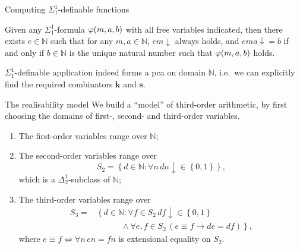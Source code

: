 \documentclass{beamer}
\begin{document}
\begin{frame}{Computing $\Sigma^1_1$-definable functions}
  \begin{lemma}
    Given any $\Sigma^1_1$-formula $\varphi\mleft(m, a, b\mright)$ with all free variables indicated, then there exists $e \in \mathbb{N}$ such that for any $m, a \in \mathbb{N}$, $em {\downarrow}$ always holds, and $ema {\downarrow} = b$ if and only if $b \in \mathbb{N}$ is the unique natural number such that $\varphi\mleft(m, a, b\mright)$ holds.
  \end{lemma}

  \vspace{1em}

  \begin{corollary}
    $\Sigma^1_1$-definable application indeed forms a pca on domain $\mathbb{N}$, i.e.\ we can explicitly find the required combinators $\mathbf{k}$ and $\mathbf{s}$.
  \end{corollary}
\end{frame}

\begin{frame}{The realisability model}
  We build a ``model'' of third-order arithmetic, by first choosing the domains of first-, second- and third-order variables.

  \begin{enumerate}
    \item The first-order variables range over $\mathbb{N}$;
    \item The second-order variables range over
          \[S_2 = \left\{d \in \mathbb{N} : \forall n \, dn {\downarrow} \in \left\{0, 1\right\}\right\},\]
          which is a $\Delta^1_2$-subclass of $\mathbb{N}$;
    \item The third-order variables range over
          \begin{align*}
            S_3 = & \left\{d \in \mathbb{N} : \forall f \in S_2 \, df {\downarrow} \in \left\{0, 1\right\}\right.            \\
                  & \qquad \quad \left.{} \land \forall e, f \in S_2 \, \left(e \equiv f \rightarrow de = df\right)\right\},
          \end{align*}
          where $e \equiv f \Leftrightarrow \forall n \, en = fn$ is extensional equality on $S_2$.
  \end{enumerate}
\end{frame}
\end{document}
